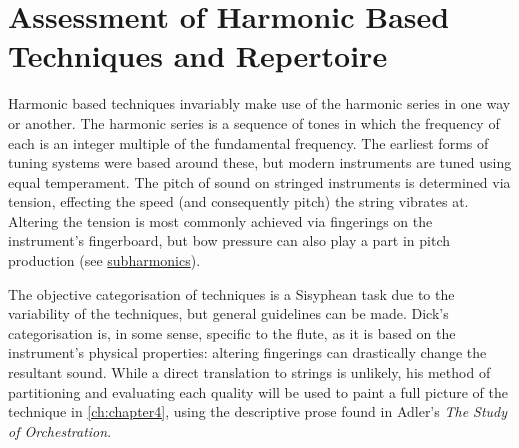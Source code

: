 
\chapter{Assessment of Harmonic Based Techniques and Repertoire}\label{ch:chapter2}



Harmonic based techniques invariably make use of the harmonic series in one way or another. 
The harmonic series is a sequence of tones in which the frequency of each is an integer multiple of the fundamental frequency.
The earliest forms of tuning systems were based around these, but modern instruments are tuned using equal temperament. 
The pitch of sound on stringed instruments is determined via tension, effecting the speed (and consequently pitch) the string vibrates at. 
Altering the tension is most commonly achieved via fingerings on the instrument's fingerboard, but bow pressure can also play a part in pitch production (see \hyperref[sec:subharmonics]{subharmonics}).

The objective categorisation of techniques is a Sisyphean task due to the variability of the techniques, but general guidelines can be made.
% 
% 
Dick's categorisation is, in some sense, specific to the flute, as it is based on the instrument's physical properties: altering fingerings can drastically change the resultant sound. 
While a direct translation to strings is unlikely, his method of partitioning and evaluating each quality will be used to paint a full picture of the technique in \autoref{ch:chapter4}, using the descriptive prose found in Adler's \emph{The Study of Orchestration}.\autocite[]{adlerStudyOrchestration2002}

